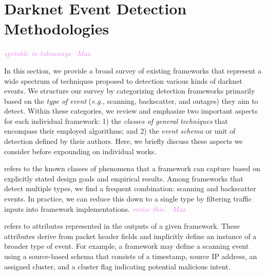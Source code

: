 \documentclass[manuscript,nonacm]{acmart}
\newcommand{\maxnote}[1]{\textit{\textcolor{violet}{#1 --Max}}}
\begin{document}

\label{sec:frameworks}
\section{Darknet Event Detection Methodologies}

\maxnote{sprinkle in takeaways}

In this section, we provide a broad survey of existing frameworks that represent a wide spectrum of techniques proposed to detection various kinds of darknet events.
We structure our survey by categorizing detection frameworks primarily based on the \textit{type of event} (\textit{e.g.,} scanning, backscatter, and outages) 
they aim to detect. Within these categories, we review and emphasize two important aspects for each individual framework: 1) the \textit{classes of general techniques} that encompass their employed algorithms; 
and 2) the \textit{event schema} or unit of detection defined by their authors. 
Here, we briefly discuss these aspects we consider before expounding on individual works.

\vspace{0.25em}
 refers to the known classes of phenomena that a framework can capture based on explicitly stated design goals and empirical results.
Among frameworks that detect multiple types, we find a frequent combination: scanning and backscatter events.
In practice, we can reduce this down to a single type by filtering traffic inputs into framework implementations.
\maxnote{revise this.}


\vspace{0.25em}
 refers to attributes represented in the outputs of a given framework.
These attributes derive from packet header fields and implicitly define an instance of a broader type of event.
For example, a framework may define a scanning event using a source-based schema that consists of a timestamp, source IP address, an assigned cluster, and a cluster flag indicating potential malicious intent.
\end{document}
